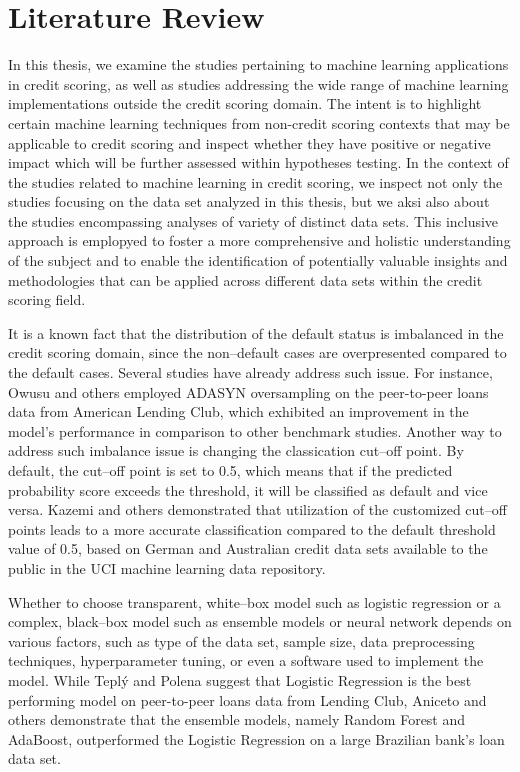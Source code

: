 \chapter{Literature Review}
\label{chap:three}

In this thesis, we examine the studies pertaining to machine learning applications in credit scoring, as well as studies addressing the wide range of machine learning implementations outside the credit scoring domain. The intent is to highlight certain machine learning techniques from non-credit scoring contexts that may be applicable to credit scoring and inspect whether they have positive or negative impact which will be further assessed within hypotheses testing.
In the context of the studies related to machine learning in credit scoring, we inspect not only the studies focusing on the data set analyzed in this thesis, but we aksi  also about the studies encompassing analyses of variety of distinct data sets.
This inclusive approach is emplopyed to foster a more comprehensive and holistic understanding of the subject and to enable the identification of potentially valuable insights and methodologies that can be applied across different data sets within the credit scoring field.

It is a known fact that the distribution of the default status is imbalanced in the credit scoring domain, since the non--default cases are overpresented compared to the default cases. Several studies have already address such issue.
For instance, Owusu and others \citep{owusu2023deep} employed ADASYN oversampling on the peer-to-peer loans data from American Lending Club, which exhibited an improvement in the model's performance in comparison to other benchmark studies.
Another way to address such imbalance issue is changing the classication cut--off point.
By default, the cut--off point is set to 0.5, which means that if the predicted probability score exceeds the threshold, it will be classified as default and vice versa. Kazemi and others \citep{kazemi2023estimation} demonstrated that utilization of the customized cut--off points leads to a more accurate classification compared to the default threshold value of 0.5, based on German and Australian credit data sets available to the public in the UCI machine learning data repository.


Whether to choose transparent, white--box model such as logistic regression or a complex, black--box model such as ensemble models or neural network depends on various factors, such as type of the data set, sample size, data preprocessing techniques, hyperparameter tuning, or even a software used to implement the model.
While Tepl\'{y} and Polena \citep{teply2020best} suggest that Logistic Regression is the best performing model on peer-to-peer loans data from Lending Club, Aniceto and others \citep{aniceto2020machine} demonstrate that the ensemble models, namely Random Forest and AdaBoost, outperformed the Logistic Regression on a large Brazilian bank's loan data set.


